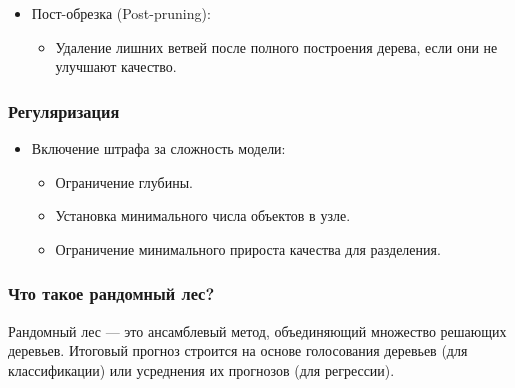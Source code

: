 \begin{enumerate}
\begin{itemize}
  \begin{itemize}
  \tightlist
  \item
    Ограничение роста дерева (например, максимальная глубина или
    минимальное количество объектов в узле).
  \end{itemize}
\item
  Пост-обрезка (Post-pruning):

  \begin{itemize}
  \tightlist
  \item
    Удаление лишних ветвей после полного построения дерева, если они не
    улучшают качество.
  \end{itemize}
\end{itemize}

\hypertarget{ux440ux435ux433ux443ux43bux44fux440ux438ux437ux430ux446ux438ux44f}{%
\subsubsection*{Регуляризация}\label{ux440ux435ux433ux443ux43bux44fux440ux438ux437ux430ux446ux438ux44f}}

\begin{itemize}
\tightlist
\item
  Включение штрафа за сложность модели:

  \begin{itemize}
  \tightlist
  \item
    Ограничение глубины.
  \item
    Установка минимального числа объектов в узле.
  \item
    Ограничение минимального прироста качества для разделения.
  \end{itemize}
\end{itemize}

\hypertarget{ux447ux442ux43e-ux442ux430ux43aux43eux435-ux440ux430ux43dux434ux43eux43cux43dux44bux439-ux43bux435ux441}{%
\subsubsection*{Что такое рандомный
лес?}\label{ux447ux442ux43e-ux442ux430ux43aux43eux435-ux440ux430ux43dux434ux43eux43cux43dux44bux439-ux43bux435ux441}}

Рандомный лес --- это ансамблевый метод, объединяющий множество решающих
деревьев. Итоговый прогноз строится на основе голосования деревьев (для
классификации) или усреднения их прогнозов (для регрессии).

\hypertarget{ux43eux441ux43dux43eux432ux43dux44bux435-ux438ux434ux435ux438-ux440ux430ux43dux434ux43eux43cux43dux43eux433ux43e-ux43bux435ux441ux430}{%
}
\end{enumerate}
